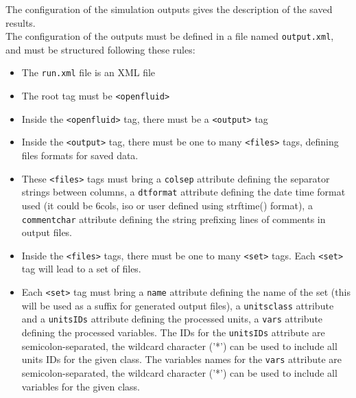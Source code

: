 The configuration of the simulation outputs gives the description of the saved results.\\
\noindent The configuration of the outputs must be defined in a file named \texttt{output.xml}, and must be structured following these rules:
\begin{itemize}
  \item The \texttt{run.xml} file is an XML file
  \item The root tag must be \texttt{<openfluid>}
  \item Inside the \texttt{<openfluid>} tag, there must be a \texttt{<output>} tag
  \item Inside the \texttt{<output>} tag, there must be one to many \texttt{<files>} tags, defining files formats for saved data.
  \item These \texttt{<files>} tags must bring a \texttt{colsep} attribute defining the separator strings between columns, a \texttt{dtformat} attribute defining the date time format used (it could be 6cols, iso or user defined using strftime() format), a \texttt{commentchar} attribute defining the string prefixing lines of comments in output files.       
  \item Inside the \texttt{<files>} tags, there must be one to many \texttt{<set>} tags. Each \texttt{<set>} tag will lead to a set of files.
  \item Each \texttt{<set>} tag must bring a \texttt{name} attribute defining the name of the set (this will be used as a suffix for generated output files), a \texttt{unitsclass} attribute and a \texttt{unitsIDs} attribute defining the processed units, a \texttt{vars} attribute defining the processed variables. The IDs for the \texttt{unitsIDs} attribute are semicolon-separated, the wildcard character ('*') can be used to include all units IDs for the given class.  The variables names for the \texttt{vars} attribute are semicolon-separated, the wildcard character ('*') can be used to include all variables for the given class.   
\end{itemize}




